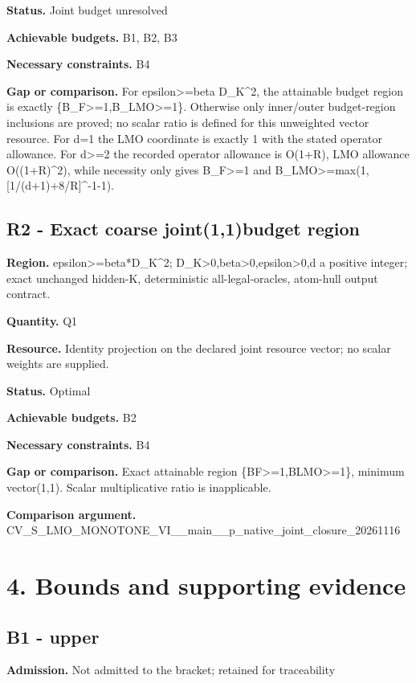 \documentclass[10pt,a4paper]{article}
\begin{document}
\textbf{Status.} Joint budget unresolved

\textbf{Achievable budgets.} B1, B2, B3

\textbf{Necessary constraints.} B4

\textbf{Gap or comparison.} For epsilon>=beta D\_\allowbreak{}K\textasciicircum{}2, the attainable budget region is exactly \{B\_\allowbreak{}F>=1,B\_\allowbreak{}LMO>=1\}. Otherwise only inner/outer budget-region inclusions are proved; no scalar ratio is defined for this unweighted vector resource. For d=1 the LMO coordinate is exactly 1 with the stated operator allowance. For d>=2 the recorded operator allowance is O(1+R), LMO allowance O((1+R)\textasciicircum{}2), while necessity only gives B\_\allowbreak{}F>=1 and B\_\allowbreak{}LMO>=max(1,[1/(d+1)+8/R]\textasciicircum{}-1-1).

\subsection{R2 - Exact coarse joint(1,1)budget region}
\textbf{Region.} epsilon>=beta*D\_\allowbreak{}K\textasciicircum{}2; D\_\allowbreak{}K>0,beta>0,epsilon>0,d a positive integer; exact unchanged hidden-K, deterministic all-legal-oracles, atom-hull output contract.

\textbf{Quantity.} Q1

\textbf{Resource.} Identity projection on the declared joint resource vector; no scalar weights are supplied.

\textbf{Status.} Optimal

\textbf{Achievable budgets.} B2

\textbf{Necessary constraints.} B4

\textbf{Gap or comparison.} Exact attainable region \{BF>=1,BLMO>=1\}, minimum vector(1,1). Scalar multiplicative ratio is inapplicable.

\textbf{Comparison argument.} CV\_\allowbreak{}S\_\allowbreak{}LMO\_\allowbreak{}MONOTONE\_\allowbreak{}VI\_\allowbreak{}\_\allowbreak{}main\_\allowbreak{}\_\allowbreak{}p\_\allowbreak{}native\_\allowbreak{}joint\_\allowbreak{}closure\_\allowbreak{}20261116

\section{4. Bounds and supporting evidence}
\subsection{B1 - upper}
\textbf{Admission.} Not admitted to the bracket; retained for traceability
\end{document}
